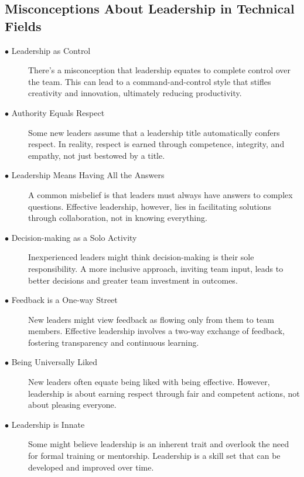 \documentclass[runningheads]{llncs}
\begin{document}
\subsection{Misconceptions About Leadership in Technical Fields}

\begin{description}

 \item [$\bullet$ Leadership as Control] There's a misconception that leadership equates to complete control over the team. This can lead to a command-and-control style that stifles creativity and innovation, ultimately reducing productivity.
  \\

 \item [$\bullet$ Authority Equals Respect] Some new leaders assume that a leadership title automatically confers respect. In reality, respect is earned through competence, integrity, and empathy, not just bestowed by a title.
  \\

 \item [$\bullet$ Leadership Means Having All the Answers] A common misbelief is that leaders must always have answers to complex questions. Effective leadership, however, lies in facilitating solutions through collaboration, not in knowing everything.
  \\

 \item [$\bullet$ Decision-making as a Solo Activity] Inexperienced leaders might think decision-making is their sole responsibility. A more inclusive approach, inviting team input, leads to better decisions and greater team investment in outcomes.
  \\

 \item [$\bullet$ Feedback is a One-way Street] New leaders might view feedback as flowing only from them to team members. Effective leadership involves a two-way exchange of feedback, fostering transparency and continuous learning.
  \\

 \item [$\bullet$ Being Universally Liked] New leaders often equate being liked with being effective. However, leadership is about earning respect through fair and competent actions, not about pleasing everyone.
  \\

 \item [$\bullet$ Leadership is Innate] Some might believe leadership is an inherent trait and overlook the need for formal training or mentorship. Leadership is a skill set that can be developed and improved over time.
  \\


\end{description}
\end{document}
